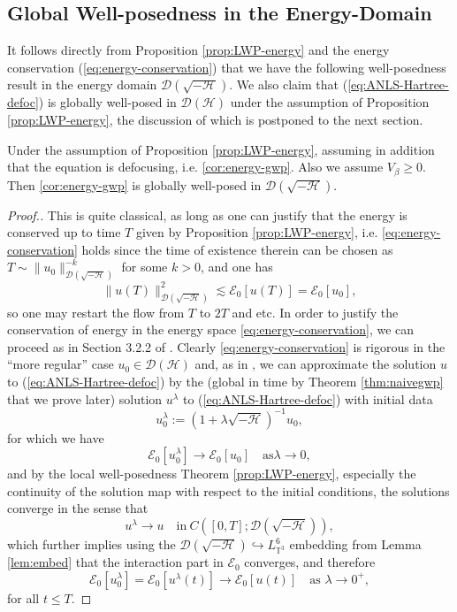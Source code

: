 \subsection{Global Well-posedness in the Energy-Domain}
It follows directly from Proposition \ref{prop:LWP-energy} and the energy
conservation (\ref{eq:energy-conservation}) that we have the following
well-posedness result in the energy domain $\mathcal{D} \left( \sqrt{-
\mathcal{H}} \right)$. We also claim that (\ref{eq:ANLS-Hartree-defoc}) is
globally well-posed in $\mathcal{D} (\mathcal{H})$ under the assumption of
Proposition \ref{prop:LWP-energy}, the discussion of which is postponed to the
next section.

\begin{cor}
  \label{cor:energy-gwp}Under the assumption of Proposition
  \ref{prop:LWP-energy}, assuming in addition that the equation is defocusing,
  i.e. \eqref{cor:energy-gwp}. Also we assume $V_{\beta} \geqslant 0.$ Then
  \eqref{cor:energy-gwp} is globally well-posed in $\mathcal{D} \left( \sqrt{-
  \mathcal{H}} \right)$.
\end{cor}

\begin{proof}[Proof.]
  This is quite classical, as long as one can justify that the energy is
  conserved up to time $T$ given by Proposition \ref{prop:LWP-energy}, i.e.
  \eqref{eq:energy-conservation} holds since the time of existence therein can
  be chosen as $T \sim \| u_0 \|^{- k}_{\mathcal{D} \left( \sqrt{-
  \mathcal{H}} \right)}$ for some $k > 0$, and one has
  \[ \| u (T) \|^2_{\mathcal{D} \left( \sqrt{- \mathcal{H}} \right)} \lesssim
     \mathcal{E}_0 [u (T)] =\mathcal{E}_0 [u_0], \]
  so one may restart the flow from $T$ to $2 T$ and etc. In order to justify the conservation of energy in the energy space
  \eqref{eq:energy-conservation}, we can proceed as in Section 3.2.2 of
  {\cite{GUZ20}}. Clearly \eqref{eq:energy-conservation} is rigorous in the
  ``more regular'' case $u_0 \in \mathcal{D} (\mathcal{H})$ and, as in
  {\cite{GUZ20}}, we can approximate the solution $u$ to
  (\ref{eq:ANLS-Hartree-defoc}) by the (global in time by Theorem
  \ref{thm:naivegwp} that we prove later) solution $u^{\lambda}$ to
  (\ref{eq:ANLS-Hartree-defoc}) with initial data
  \[ u^{\lambda}_0 := \left( 1 + \lambda \sqrt{- \mathcal{H}} \right)^{-
     1} u_0, \]
  for which we have
  \[ \mathcal{E}_0 [u^{\lambda}_0] \rightarrow \mathcal{E}_0 [u_0] \quad
     \mathrm{as} \lambda \rightarrow 0, \]
  and by the local well-posedness Theorem \ref{prop:LWP-energy}, especially
  the continuity of the solution map with respect to the initial conditions,
  the solutions converge in the sense that
  \[ u^{\lambda} \rightarrow u \quad \mathrm{in} \ C \left( [0, T] ; \mathcal{D}
     \left( \sqrt{- \mathcal{H}} \right) \right), \]
  which further implies using the $\mathcal{D} \left( \sqrt{- \mathcal{H}}
  \right) \hookrightarrow L^6_{\mathbb{T}^3}$ embedding from Lemma
  \ref{lem:embed} that the interaction part in $\mathcal{E}_0$ converges, and
  therefore
  \[ \mathcal{E}_0 [u^{\lambda}_0] =\mathcal{E}_0 [u^{\lambda} (t)]
     \rightarrow \mathcal{E}_0 [u (t)] \quad \text{as } \lambda \rightarrow
     0^+, \]
  for all $t \leqslant T$. 
\end{proof}

